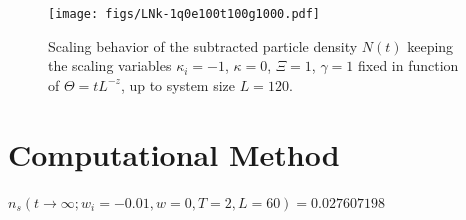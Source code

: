 \documentclass[pra,twocolumn,preprintnumbers,amsmath,amssymb,nofootinbib,floatfix,longbibliography]{revtex4}
\begin{document}
\begin{figure}[!htb]
  \texttt{[image: figs/LNk-1q0e100t100g1000.pdf]}
  \caption{Scaling behavior of the subtracted particle
  density $N(t)$ keeping the scaling
  variables $\kappa_i=-1$, $\kappa=0$, $\Xi = 1$,
    $\gamma=1$ fixed in function of
    $\Theta = tL^{-z}$, up to system size $L=120$.}
  \label{k-1q0e100t100g1000}
\end{figure}









\appendix

\section{Computational Method}

$n_s(t\to \infty; w_i=-0.01, w=0, T=2, L=60) =
0.027607198$


\end{document}
